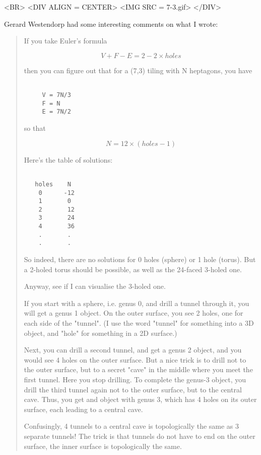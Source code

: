 <BR>
<DIV ALIGN = CENTER>
<IMG SRC = 7-3.gif>
</DIV>

Gerard Westendorp had some interesting comments on what
I wrote:

\begin{quote}
If you take Euler's formula

$$

     V+F-E = 2-2\times holes
$$
    
then you can figure out that for a (7,3) tiling with N heptagons,
you have

\begin{verbatim}

     V = 7N/3
     F = N
     E = 7N/2
\end{verbatim}
    
so that

$$

     N = 12\times (holes-1)
$$
    
Here's the table of solutions:

\begin{verbatim}

   holes    N
    0      -12
    1       0
    2       12
    3       24
    4       36
    .       . 
    .       . 
\end{verbatim}
    
So indeed, there are no solutions for 0 holes (sphere)
or 1 hole (torus).  But a 2-holed torus should be possible,
as well as the 24-faced 3-holed one.

Anyway, see if I can visualise the 3-holed one.

If you start with a sphere, i.e. genus 0, and drill
a tunnel through it, you will get a genus 1 object. On
the outer surface, you see 2 holes, one for each side
of the "tunnel". (I use the word "tunnel"
for something into a 3D object, and "hole" for something
in a 2D surface.)

Next, you can drill a second tunnel, and get a genus 2 object,
and you would see 4 holes on the outer surface.
But a nice trick is to drill not to the outer surface,
but to a secret "cave" in the middle where you meet the
first tunnel. Here you stop drilling. To complete
the genus-3 object, you drill the third tunnel again not
to the outer surface, but to the central cave. Thus, you
get and object with genus 3, which has 4 holes on its
outer surface, each leading to a central cave.

Confusingly, 4 tunnels to a central cave is topologically
the same as 3 separate tunnels!  The trick is that tunnels
do not have to end on the outer surface, the inner surface
is topologically the same.


\end{quote}
